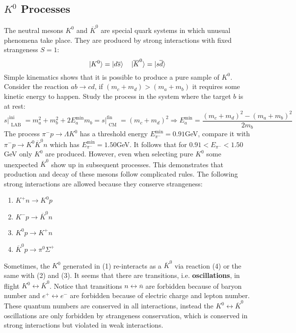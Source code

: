 \documentclass[10.75pt,a4paper,openright,bottom=2cm]{article}
\begin{document}
\subsection{$K^0$ Processes}
The neutral mesons $K^0$ and $\overline{K}^0$ are special quark systems in which unusual phenomena take place. They are produced by strong interactions with fixed strangeness $S=1$:
\[
\ket{K^0}=\ket{d\overline{s}} \quad \ket{\overline{K}^0}=\ket{s\overline{d}}
\]
Simple kinematics shows that it is possible to produce a pure sample of $K^0$. Consider the reaction $ab\to cd$, if $(m_c+m_d)>(m_a+m_b)$ it requires some kinetic energy to happen. Study the process in the system where the target $b$ is at rest:
\[
s\Bigr|_{\substack{\text{LAB}}}^{\text{ini}}=m_a^2+m_b^2+2E_a^{\min} m_b=s\Bigr|_{\substack{\text{CM}}}^{\text{fin}}=(m_c+m_d)^2\Rightarrow E_a^{\min}=\frac{(m_c+m_d)^2-(m_a+m_b)^2}{2m_b}
\]
The process $\pi^- p\to\Lambda K^0$ has a threshold energy $E_{\pi^-}^{\min}=0.91$\;GeV, compare it with\\
$\pi^- p\to K^0\overline{K}^0n$ which has $E_{\pi^-}^{\min}=1.50$\;GeV. It follows that for $0.91<E_{\pi^-}<1.50$\;GeV only $K^0$ are produced. However, even when selecting pure $K^0$ some unexpected $\overline{K}^0$ show up in subsequent processes. This demonstrates that production and decay of these mesons follow complicated rules. The following strong interactions are allowed because they conserve strangeness:
\begin{enumerate}
    \item $K^+n\to K^0p$
    \item $K^-p\to\overline{K}^0n$
    \item $K^0p\to K^+n$
    \item $\overline{K}^0p\to\pi^0\Sigma^+$
\end{enumerate}
Sometimes, the $K^0$ generated in (1) re-interacts as a $\overline{K}^0$ via reaction (4) or the same with (2) and (3). It seems that there are transitions, i.e. \textbf{oscillations}, in flight $K^0\leftrightarrow\overline{K}^0$. Notice that transitions $n\leftrightarrow\overline{n}$ are forbidden because of baryon number and $e^+\leftrightarrow e^-$ are forbidden because of electric charge and lepton number. These quantum numbers are conserved in all interactions, instead the $K^0\leftrightarrow\overline{K}^0$ oscillations are only forbidden by strangeness conservation, which is conserved in strong interactions but violated in weak interactions.
\end{document}
